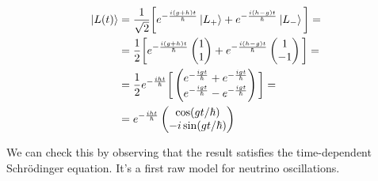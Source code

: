 \begin{enumerate}
        \begin{align*}
            \ket{L(t)}&=\frac{1}{\sqrt{2}}\bigg[e^{-\frac{i(g+h)t}{\hbar}}\ket{L_+}+e^{-\frac{i(h-g)t}{\hbar}}\ket{L_-}\bigg]=\\
                      &=\frac{1}{2}\bigg[e^{-\frac{i(g+h)t}{\hbar}}\begin{pmatrix}1\\1\end{pmatrix}+e^{-\frac{i(h-g)t}{\hbar}}\begin{pmatrix}1\\-1\end{pmatrix}\bigg]=\\
                      &=\frac{1}{2}e^{-\frac{iht}{\hbar}}\bigg[\begin{pmatrix}e^{-\frac{igt}{\hbar}}+e^{-\frac{igt}{\hbar}}\\e^{-\frac{igt}{\hbar}}-e^{-\frac{igt}{\hbar}}\end{pmatrix}\bigg]=\\
                      &=e^{-\frac{iht}{\hbar}}\begin{pmatrix}\cos (gt/\hbar)\\-i\sin (gt/\hbar)\end{pmatrix}
        \end{align*}
\end{enumerate}
We can check this by observing that the result satisfies the time-dependent Schr\"odinger equation. It's a first raw model for neutrino oscillations.
